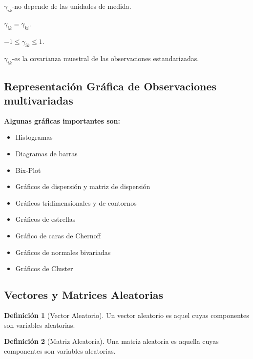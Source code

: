 \documentclass[
]{book}
\providecommand{\tightlist}{%
  \setlength{\itemsep}{0pt}\setlength{\parskip}{0pt}}
\theoremstyle{definition}
\newtheorem{definition}{Definición}[chapter]
\theoremstyle{definition}
\theoremstyle{definition}
\theoremstyle{definition}
\theoremstyle{remark}
\begin{document}
\(\gamma_{ik}\)-no depende de las unidades de medida.

\(\gamma_{ik}=\gamma_{ki}\).

\(-1\leq \gamma_{ik}\leq 1\).

\(\gamma_{ik}\)-es la covarianza muestral de las observaciones estandarizadas.

\hypertarget{representaciuxf3n-gruxe1fica-de-observaciones-multivariadas}{%
\subsection{Representación Gráfica de Observaciones multivariadas}\label{representaciuxf3n-gruxe1fica-de-observaciones-multivariadas}}

\textbf{Algunas gráficas importantes son:}

\begin{itemize}
\tightlist
\item
  Histogramas
\item
  Diagramas de barras
\item
  Bix-Plot
\item
  Gráficos de dispersión y matriz de dispersión
\item
  Gráficos tridimensionales y de contornos
\item
  Gráficos de estrellas
\item
  Gráfico de caras de Chernoff
\item
  Gráficos de normales bivariadas
\item
  Gráficos de Cluster
\end{itemize}

\hypertarget{vectores-y-matrices-aleatorias}{%
\subsection{Vectores y Matrices Aleatorias}\label{vectores-y-matrices-aleatorias}}

\begin{definition}[Vector Aleatorio]
\protect\hypertarget{def:vector-aleatorio}{}\label{def:vector-aleatorio}Un vector aleatorio es aquel cuyas componentes son variables aleatorias.
\end{definition}

\begin{definition}[Matriz Aleatoria]
\protect\hypertarget{def:matriz-aleatoria}{}\label{def:matriz-aleatoria}Una matriz aleatoria es aquella cuyas componentes son variables aleatorias.
\end{definition}
\end{document}
